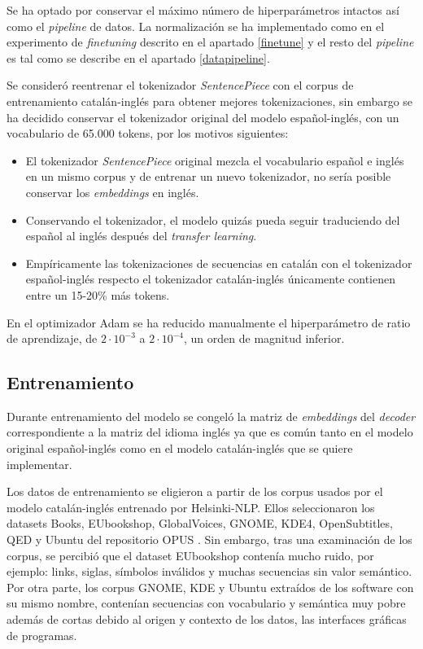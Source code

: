 Se ha optado por conservar el máximo número de hiperparámetros intactos así como el \textit{pipeline} de datos. La normalización se ha implementado como en el experimento de \textit{finetuning} descrito en el apartado \ref{finetune} y el resto del \textit{pipeline} es tal como se describe en el apartado \ref{datapipeline}.

Se consideró reentrenar el tokenizador \textit{SentencePiece} con el corpus de entrenamiento catalán-inglés para obtener mejores tokenizaciones, sin embargo se ha decidido conservar el tokenizador original del modelo español-inglés, con un vocabulario de 65.000 tokens, por los motivos siguientes:
\begin{itemize}
    \item El tokenizador \textit{SentencePiece} original mezcla el vocabulario español e inglés en un mismo corpus y de entrenar un nuevo tokenizador, no sería posible conservar los \textit{embeddings} en inglés.
    \item Conservando el tokenizador, el modelo quizás pueda seguir traduciendo del español al inglés después del \textit{transfer learning}.
    \item Empíricamente las tokenizaciones de secuencias en catalán con el tokenizador español-inglés respecto el tokenizador catalán-inglés únicamente contienen entre un 15-20\% más tokens.
\end{itemize}

En el optimizador Adam \cite{Kingma2014Dec} se ha reducido manualmente el hiperparámetro de ratio de aprendizaje, de $2\cdot 10^{-3}$ a $2\cdot 10^{-4}$, un orden de magnitud inferior.


\subsection{Entrenamiento}

Durante entrenamiento del modelo se congeló la matriz de \textit{embeddings} del \textit{decoder} correspondiente a la matriz del idioma inglés ya que es común tanto en el modelo original español-inglés como en el modelo catalán-inglés que se quiere implementar.

Los datos de entrenamiento se eligieron a partir de los corpus usados por el modelo catalán-inglés entrenado por Helsinki-NLP. Ellos seleccionaron los datasets Books, EUbookshop, GlobalVoices, GNOME, KDE4, OpenSubtitles, QED y Ubuntu del repositorio OPUS \cite{CORPUS}. Sin embargo, tras una examinación de los corpus, se percibió que el dataset EUbookshop contenía mucho ruido, por ejemplo: links, siglas, símbolos inválidos y muchas secuencias sin valor semántico. Por otra parte, los corpus GNOME, KDE y Ubuntu extraídos de los software con su mismo nombre, contenían secuencias con vocabulario y semántica muy pobre además de cortas debido al origen y contexto de los datos, las interfaces gráficas de programas.

